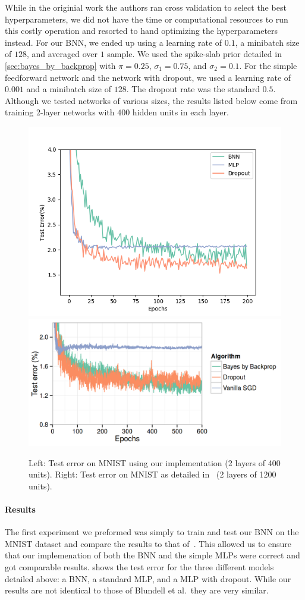 \documentclass[11pt]{article}
\begin{document}
While in the originial work the authors ran cross validation to select the best
hyperparameters, we did not have the time or computational resources to run this
costly operation and resorted to hand optimizing the hyperparameters instead.
For our BNN, we ended up using a learning rate of $0.1$, a minibatch size of 
$128$, and averaged over $1$ sample. We used the spike-slab prior detailed in
\cref{sec:bayes_by_backprop} with $\pi = 0.25$, $\sigma_1 = 0.75$, and 
$\sigma_2 = 0.1$. For the simple feedforward network and the network with 
dropout, we used a learning rate of $0.001$ and a minibatch size of $128$.
The dropout rate was the standard $0.5$. Although we tested networks of various
sizes, the results listed below come from training 2-layer networks with
$400$ hidden units in each layer.

\begin{figure}[H]
  \centering
  \includegraphics[width=.45\textwidth]{figures/test_error_compare.png}
  \includegraphics[width=.45\textwidth]{figures/test_error_compare_paper.png}
  \caption{Left: Test error on MNIST using our implementation (2 layers of 400
  units).  Right: Test error on MNIST as detailed in~\cite{blundell} (2 layers
  of 1200 units).}\label{fig:mnist_test_error}
\end{figure}
 

\paragraph{Results}

The first experiment we preformed was simply to train and test our BNN on the
MNIST dataset and compare the results to that of~\cite{blundell}. This allowed
us to ensure that our implemenation of both the BNN and the simple MLPs were
correct and got comparable results.  shows the
test error for the three different models detailed above: a BNN, a standard
MLP, and a MLP with dropout. While our results are not identical to those of
Blundell et al.\, they are very similar. 
\end{document}

